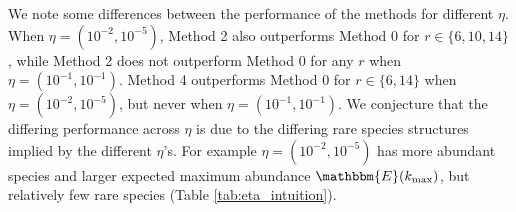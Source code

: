 \documentclass[12pt]{article}
\begin{document}
We note some differences between the performance of the methods for different $\eta.$ When $\eta = (10^{-2},10^{-5})$, Method 2 also outperforms Method 0 for $r \in \{6, 10, 14\}$, while Method 2 does not outperform Method 0 for any $r$ when $\eta = (10^{-1},10^{-1})$.  Method 4 outperforms Method 0 for $r \in \{6, 14\}$ when $\eta = (10^{-2},10^{-5})$, but never when $\eta = (10^{-1},10^{-1})$.
We conjecture that the differing performance across $\eta$ is due to the differing rare species structures implied by the different $\eta$'s. For example $\eta = (10^{-2},10^{-5})$ has more abundant species and larger expected maximum abundance $\mathbbm{E}(k_{\text{max}})$, but relatively few rare species (Table \ref{tab:eta_intuition}).


\end{document}
